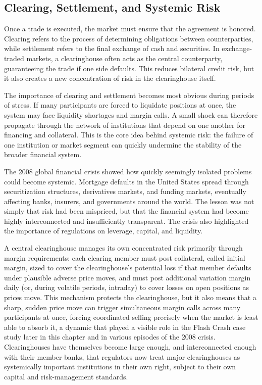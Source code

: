 \documentclass[../ai_in_finance]{subfiles}
\begin{document}
\subsection{Clearing, Settlement, and Systemic Risk}

Once a trade is executed, the market must ensure that the agreement is honored. Clearing refers to the process of determining obligations between counterparties, while settlement refers to the final exchange of cash and securities. In exchange-traded markets, a clearinghouse often acts as the central counterparty, guaranteeing the trade if one side defaults. This reduces bilateral credit risk, but it also creates a new concentration of risk in the clearinghouse itself.

The importance of clearing and settlement becomes most obvious during periods of stress. If many participants are forced to liquidate positions at once, the system may face liquidity shortages and margin calls. A small shock can therefore propagate through the network of institutions that depend on one another for financing and collateral. This is the core idea behind systemic risk: the failure of one institution or market segment can quickly undermine the stability of the broader financial system.

The 2008 global financial crisis showed how quickly seemingly isolated problems could become systemic. Mortgage defaults in the United States spread through securitization structures, derivatives markets, and funding markets, eventually affecting banks, insurers, and governments around the world. The lesson was not simply that risk had been mispriced, but that the financial system had become highly interconnected and insufficiently transparent. The crisis also highlighted the importance of regulations on leverage, capital, and liquidity.

A central clearinghouse manages its own concentrated risk primarily through margin requirements: each clearing member must post collateral, called initial margin, sized to cover the clearinghouse's potential loss if that member defaults under plausible adverse price moves, and must post additional variation margin daily (or, during volatile periods, intraday) to cover losses on open positions as prices move. This mechanism protects the clearinghouse, but it also means that a sharp, sudden price move can trigger simultaneous margin calls across many participants at once, forcing coordinated selling precisely when the market is least able to absorb it, a dynamic that played a visible role in the Flash Crash case study later in this chapter and in various episodes of the 2008 crisis.
Clearinghouses have themselves become large enough, and interconnected enough with their member banks, that regulators now treat major clearinghouses as systemically important institutions in their own right, subject to their own capital and risk-management standards.
\end{document}
